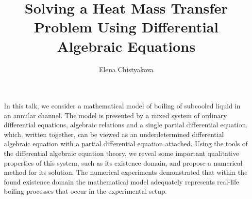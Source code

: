 \documentclass[12pt]{llncs}
\begin{document}
%
\fi
\title{Solving a Heat Mass Transfer Problem Using Differential Algebraic Equations}
\author{Elena Chistyakova}

\maketitle

\begin{abstract}

\end{abstract}
In this talk, we consider a mathematical model of boiling
of subcooled liquid in an annular channel. The model is presented by
a mixed system of ordinary differential equations, algebraic relations
and a single partial differential equation, which, written together, can
be viewed as an underdetermined differential algebraic equation with a
partial differential equation attached. Using the tools of the differential
algebraic equation theory, we reveal some important qualitative properties of this system, such as its existence domain, and propose a numerical
method for its solution. The numerical experiments demonstrated that
within the found existence domain the mathematical model adequately
represents real-life boiling processes that occur in the experimental setup.


\end{document}
